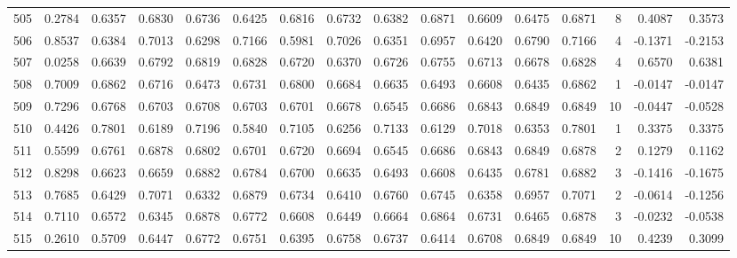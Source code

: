 \begin{tabular}{lrrrrrrrrrrrrrrr}
505 &      0.2784 &  0.6357 &  0.6830 &  0.6736 &  0.6425 &  0.6816 &  0.6732 &  0.6382 &  0.6871 &  0.6609 &   0.6475 &     0.6871 &      8 &                    0.4087 &                     0.3573 \\
506 &      0.8537 &  0.6384 &  0.7013 &  0.6298 &  0.7166 &  0.5981 &  0.7026 &  0.6351 &  0.6957 &  0.6420 &   0.6790 &     0.7166 &      4 &                   -0.1371 &                    -0.2153 \\
507 &      0.0258 &  0.6639 &  0.6792 &  0.6819 &  0.6828 &  0.6720 &  0.6370 &  0.6726 &  0.6755 &  0.6713 &   0.6678 &     0.6828 &      4 &                    0.6570 &                     0.6381 \\
508 &      0.7009 &  0.6862 &  0.6716 &  0.6473 &  0.6731 &  0.6800 &  0.6684 &  0.6635 &  0.6493 &  0.6608 &   0.6435 &     0.6862 &      1 &                   -0.0147 &                    -0.0147 \\
509 &      0.7296 &  0.6768 &  0.6703 &  0.6708 &  0.6703 &  0.6701 &  0.6678 &  0.6545 &  0.6686 &  0.6843 &   0.6849 &     0.6849 &     10 &                   -0.0447 &                    -0.0528 \\
510 &      0.4426 &  0.7801 &  0.6189 &  0.7196 &  0.5840 &  0.7105 &  0.6256 &  0.7133 &  0.6129 &  0.7018 &   0.6353 &     0.7801 &      1 &                    0.3375 &                     0.3375 \\
511 &      0.5599 &  0.6761 &  0.6878 &  0.6802 &  0.6701 &  0.6720 &  0.6694 &  0.6545 &  0.6686 &  0.6843 &   0.6849 &     0.6878 &      2 &                    0.1279 &                     0.1162 \\
512 &      0.8298 &  0.6623 &  0.6659 &  0.6882 &  0.6784 &  0.6700 &  0.6635 &  0.6493 &  0.6608 &  0.6435 &   0.6781 &     0.6882 &      3 &                   -0.1416 &                    -0.1675 \\
513 &      0.7685 &  0.6429 &  0.7071 &  0.6332 &  0.6879 &  0.6734 &  0.6410 &  0.6760 &  0.6745 &  0.6358 &   0.6957 &     0.7071 &      2 &                   -0.0614 &                    -0.1256 \\
514 &      0.7110 &  0.6572 &  0.6345 &  0.6878 &  0.6772 &  0.6608 &  0.6449 &  0.6664 &  0.6864 &  0.6731 &   0.6465 &     0.6878 &      3 &                   -0.0232 &                    -0.0538 \\
515 &      0.2610 &  0.5709 &  0.6447 &  0.6772 &  0.6751 &  0.6395 &  0.6758 &  0.6737 &  0.6414 &  0.6708 &   0.6849 &     0.6849 &     10 &                    0.4239 &                     0.3099 \\

\end{tabular}
